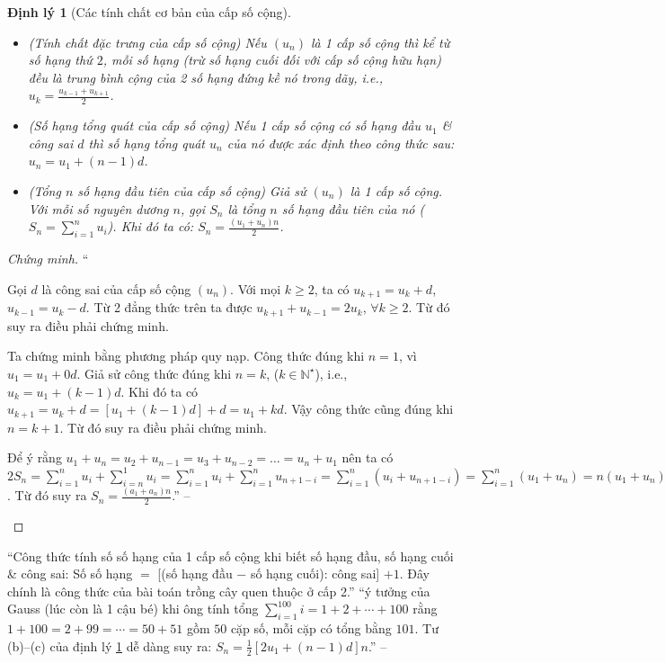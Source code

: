 \documentclass[oneside]{book}
\numberwithin{equation}{section}
\newtheorem{dinhly}{Định lý}[section]
\begin{document}
\begin{dinhly}[Các tính chất cơ bản của cấp số cộng]
	\label{thm:cac tinh chat co ban cua cap so cong}
	\begin{itemize}
		\item[(a)] \emph{(Tính chất đặc trưng của cấp số cộng)} Nếu $(u_n)$ là 1 cấp số cộng thì kể từ số hạng thứ $2$, mỗi số hạng (trừ số hạng cuối đối với cấp số cộng hữu hạn) đều là trung bình cộng của 2 số hạng đứng kề nó trong dãy, i.e., $u_k = \frac{u_{k-1} + u_{k+1}}{2}$.
		\item[(b)] \emph{(Số hạng tổng quát của cấp số cộng)} Nếu 1 cấp số cộng có số hạng đầu $u_1$ \& công sai $d$ thì số hạng tổng quát $u_n$ của nó được xác định theo công thức sau: $u_n = u_1 + (n - 1)d$.
		\item[(c)] \emph{(Tổng $n$ số hạng đầu tiên của cấp số cộng)} Giả sử $(u_n)$ là 1 cấp số cộng. Với mỗi số nguyên dương $n$, gọi $S_n$ là tổng $n$ số hạng đầu tiên của nó ($S_n = \sum_{i=1}^n u_i$). Khi đó ta có: $S_n = \frac{(u_1 + u_n)n}{2}$.
	\end{itemize}
\end{dinhly}

\begin{proof}[Chứng minh]
	``\begin{enumerate*}
		\item[(a)] Gọi $d$ là công sai của cấp số cộng $(u_n)$. Với mọi $k\ge 2$, ta có $u_{k+1} = u_k + d$, $u_{k-1} = u_k - d$. Từ 2 đẳng thức trên ta được $u_{k+1} + u_{k-1} = 2u_k$, $\forall k\ge 2$. Từ đó suy ra điều phải chứng minh.
		\item[(b)] Ta chứng minh bằng phương pháp quy nạp. Công thức đúng khi $n = 1$, vì $u_1 = u_1 + 0d$. Giả sử công thức đúng khi $n = k$, ($k\in\mathbb{N}^\star$), i.e., $u_k = u_1 + (k - 1)d$. Khi đó ta có $u_{k+1} = u_k + d = [u_1 + (k-1)d] + d = u_1 + kd$. Vậy công thức cũng đúng khi $n = k + 1$. Từ đó suy ra điều phải chứng minh.
		\item[(c)] Để ý rằng $u_1 + u_n = u_2 + u_{n-1} = u_3 + u_{n-2} = \ldots = u_n + u_1$ nên ta có $2S_n = \sum_{i=1}^n u_i + \sum_{i=n}^1 u_i = \sum_{i=1}^n u_i + \sum_{i=1}^n u_{n+1-i} = \sum_{i=1}^n (u_i + u_{n+1-i}) = \sum_{i=1}^n (u_1 + u_n) = n(u_1 + u_n)$. Từ đó suy ra $S_n = \frac{(a_1 + a_n)n}{2}$.'' -- \cite[pp. 124--125]{TL_chuyen_Toan_Dai_So_Giai_Tich_11}
	\end{enumerate*}
\end{proof}
``Công thức tính số số hạng của 1 cấp số cộng khi biết số hạng đầu, số hạng cuối \& công sai: Số số hạng $=$ [(số hạng đầu $-$ số hạng cuối): công sai] $+ 1$. Đây chính là công thức của bài toán trồng cây quen thuộc ở cấp 2.'' ``ý tưởng của Gauss (lúc còn là 1 cậu bé) khi ông  tính tổng $\sum_{i=1}^{100} i = 1 + 2 + \cdots + 100$ rằng $1 + 100 = 2 + 99 = \cdots = 50 + 51$ gồm $50$ cặp số, mỗi cặp có tổng bằng $101$. Tư (b)--(c) của định lý \ref{thm:cac tinh chat co ban cua cap so cong} dễ dàng suy ra: $S_n = \frac{1}{2}[2u_1 + (n - 1)d]n$.'' -- \cite[p. 126]{TL_chuyen_Toan_Dai_So_Giai_Tich_11}
\end{document}
